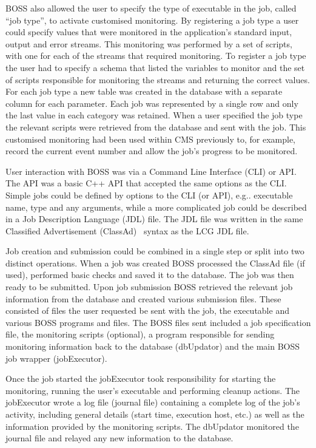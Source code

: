 BOSS also allowed the user to specify the type of executable in the job, called ``job type'', to activate customised monitoring. By registering a job type a user could specify values that were monitored in the application's standard input, output and error streams. This monitoring was performed by a set of scripts, with one for each of the streams that required monitoring. To register a job type the user had to specify a schema that listed the variables to monitor and the set of scripts responsible for monitoring the streams and returning the correct values. For each job type a new table was created in the database with a separate column for each parameter. Each job was represented by a single row and only the last value in each category was retained. When a user specified the job type the relevant scripts were retrieved from the database and sent with the job. This customised monitoring had been used within CMS previously to, for example, record the current event number and allow the job's progress to be monitored. 

User interaction with BOSS was via a Command Line Interface (CLI) or API. The API was a basic C++ API that accepted the same options as the CLI. Simple jobs could be defined by options to the CLI (or API), e.g.. executable name, type and any arguments, while a more complicated job could be described in a Job Description Language (JDL) file. The JDL file was written in the same Classified Advertisement (ClassAd)~\cite{citeulike:835507} syntax as the LCG JDL file. 

Job creation and submission could be combined in a single step or split into two distinct operations. When a job was created BOSS processed the ClassAd file (if used), performed basic checks and saved it to the database. The job was then ready to be submitted. Upon job submission BOSS retrieved the relevant job information from the database and created various submission files. These consisted of files the user requested be sent with the job, the executable and various BOSS programs and files. The BOSS files sent included a job specification file, the monitoring scripts (optional), a program responsible for sending monitoring information back to the database (dbUpdator) and the main BOSS job wrapper (jobExecutor). 

Once the job started the jobExecutor took responsibility for starting the monitoring, running the user's executable and performing cleanup actions. The jobExecutor wrote a log file (journal file) containing a complete log of the job's activity, including general details (start time, execution host, etc.) as well as the information provided by the monitoring scripts. The dbUpdator monitored the journal file and relayed any new information to the database. 

